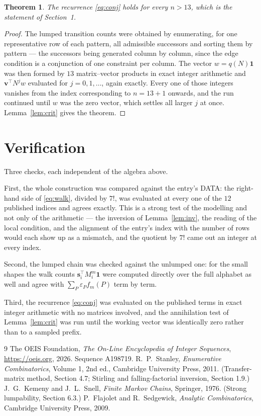 \documentclass[11pt,a4paper]{article}
\theoremstyle{plain}
\newtheorem{theorem}{Theorem}
\theoremstyle{definition}
\begin{document}
\begin{theorem}
The recurrence \eqref{eq:conj} holds for every $n>13$, which is the statement of
Section~1.
\end{theorem}

\begin{proof}
The lumped transition counts were obtained by enumerating, for one representative row of
each pattern, all admissible successors and sorting them by pattern --- the successors being
generated column by column, since the edge condition is a conjunction of one constraint per
column. The vector $w=q(N)\mathbf{1}$ was then formed by $13$ matrix--vector products
in exact integer arithmetic and $\mathbf{v}^{\!\top}N^{j}w$ evaluated for
$j=0,1,\dots$, again exactly. Every one of those integers vanishes from the index
corresponding to $n=13+1$ onwards, and the run continued until $w$ was the zero vector,
which settles all larger $j$ at once. Lemma~\ref{lem:crit} gives the theorem.
\end{proof}

\section{Verification}

Three checks, each independent of the algebra above.

First, the whole construction was compared against the entry's DATA: the right-hand side of
\eqref{eq:walk}, divided by $7!$, was evaluated at every one of the $12$
published indices and agrees exactly. This is a strong test of the modelling and not only of
the arithmetic --- the inversion of Lemma~\ref{lem:inv}, the reading of the local
condition, and the alignment of the entry's index with the number of rows would each
show up as a mismatch, and the quotient by $7!$ came out an integer at every index.

Second, the lumped chain was checked against the unlumped one: for the small shapes the walk
counts $\mathbf{s}_i^{\!\top}M_i^{m}\mathbf{1}$ were computed directly over the full
alphabet as well and agree with $\sum_P\varepsilon_Pf_m(P)$ term by term.

Third, the recurrence \eqref{eq:conj} was evaluated on the published terms in exact integer
arithmetic with no matrices involved, and the annihilation test of Lemma~\ref{lem:crit} was
run until the working vector was identically zero rather than to a sampled prefix.

\begin{thebibliography}{9}
 The OEIS Foundation, \emph{The On-Line Encyclopedia of Integer
Sequences}, \url{https://oeis.org}, 2026. Sequence A198719.
 R.~P.~Stanley, \emph{Enumerative Combinatorics}, Volume 1, 2nd ed.,
Cambridge University Press, 2011. (Transfer-matrix method, Section 4.7; Stirling and
falling-factorial inversion, Section 1.9.)
 J.~G.~Kemeny and J.~L.~Snell, \emph{Finite Markov Chains}, Springer,
1976. (Strong lumpability, Section 6.3.)
 P.~Flajolet and R.~Sedgewick, \emph{Analytic Combinatorics}, Cambridge
University Press, 2009.
\end{thebibliography}
\end{document}
